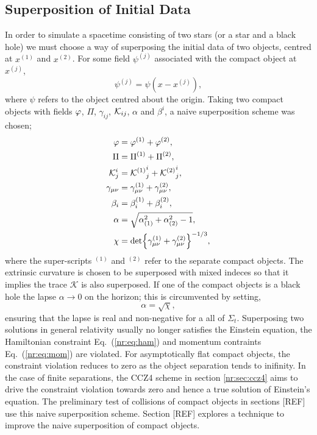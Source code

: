 \subsection{Superposition of Initial Data}
In order to simulate a spacetime consisting of two stars (or a star and a black hole) we must choose a way of superposing the initial data of two objects, centred at $x^{(1)}$ and $x^{(2)}$. For some field $\psi^{(j)}$ associated with the compact object at $x^{(j)}$,
\begin{equation}
\psi^{(j)} = \psi(x-x^{(j)}),
\end{equation} where $\psi$ refers to the object centred about the origin.
Taking two compact objects with fields $\varphi$, $\Pi$, $\gamma_{ij}$, $\mathcal{K}_{ij}$, $\alpha$ and $\beta^i$, a naive superposition scheme was chosen;
\begin{align}
 \varphi &= \varphi^{(1)} + \varphi^{(2)},\\
\Pi &= \Pi^{(1)} + \Pi^{(2)},\\
 \mathcal{K}^i_j &= {\mathcal{K}^{(1)}}^i_j+{\mathcal{K}^{(2)}}^i_j,\\
 \gamma_{\mu\nu} &= \gamma^{(1)}_{\mu\nu} + \gamma^{(2)}_{\mu\nu},\\
\beta_i &= \beta^{(1)}_i + \beta^{(2)}_i ,\\
 \alpha &= \sqrt{\alpha_{(1)}^2 + \alpha_{(2)}^2-1},\\
 \chi &= \det{\gamma^{(1)}_{\mu\nu} + \gamma^{(2)}_{\mu\nu}}^{-1/3},
 \end{align}
where the super-scripts ${}^{(1)}$ and ${}^{(2)}$ refer to the separate compact objects. The extrinsic curvature is chosen to be superposed with mixed indeces so that it implies the trace $\mathcal{K}$ is also superposed. If one of the compact objects is a black hole the lapse $\alpha \rightarrow 0$ on the horizon; this is circumvented by setting,
\begin{equation} \alpha = \sqrt{\chi},\end{equation}
ensuring that the lapse is real and non-negative for a all of $\Sigma_t$. Superposing two solutions in general relativity usually no longer satisfies the Einstein equation, the Hamiltonian constraint Eq.~(\ref{nr:eq:ham}) and momentum contraints Eq.~(\ref{nr:eq:mom}) are violated. For asymptotically flat compact objects, the constraint violation reduces to zero as the object separation tends to inifinity. In the case of finite separations, the CCZ4 scheme in section \ref{nr:sec:ccz4} aims to drive the constraint violation towards zero and hence a true solution of Einstein's equation. The preliminary test of collisions of compact objects in sections [REF] use this naive superposition scheme. Section [REF] explores a technique to improve the naive superposition of compact objects.



